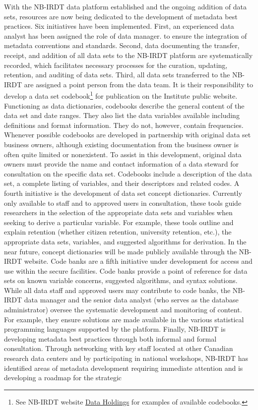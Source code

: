 With the NB-IRDT data platform established and the ongoing addition of data sets, resources are now being dedicated to the development of metadata best practices. Six initiatives have been implemented. First, an experienced data analyst has been assigned the role of data manager. to ensure the integration of metadata conventions and standards. Second, data documenting the transfer, receipt, and addition of all data sets to the NB-IRDT platform are systematically recorded, which facilitates necessary processes for the curation, updating, retention, and auditing of data sets. Third, all data sets transferred to the NB-IRDT are assigned a point person from the data team. It is their responsibility to develop a data set codebook\footnote{See NB-IRDT website \href{https://www.nbirdt.ca/holdings}{Data Holdings} for examples of available codebooks.} for publication on the Institute public website. Functioning as data dictionaries, codebooks describe the general content of the data set and date ranges. They also list the data variables available including definitions and format information. They do not, however, contain frequencies. Whenever possible codebooks are developed in partnership with original data set business owners, although existing documentation from the business owner is often quite limited or nonexistent. To assist in this development, original data owners must provide the name and contact information of a data steward for consultation on the specific data set. Codebooks include a description of the data set, a complete listing of variables, and their descriptors and related codes. A fourth initiative is the development of data set concept dictionaries. Currently only available to staff and to approved users in consultation, these tools guide researchers in the selection of the appropriate data sets and variables when seeking to derive a particular variable. For example, these tools outline and explain retention (whether citizen retention, university retention, etc.), the appropriate data sets, variables, and suggested algorithms for derivation. In the near future, concept dictionaries will be made publicly available through the NB-IRDT website. Code banks are a fifth initiative under development for access and use within the secure facilities. Code banks provide a point of reference for data sets on known variable concerns, suggested algorithms, and syntax solutions. While all data staff and approved users may contribute to code banks, the NB-IRDT data manager and the senior data analyst (who serves as the database administrator) oversee the systematic development and monitoring of content. For example, they ensure solutions are made available in the various statistical programming languages supported by the platform. Finally, NB-IRDT is developing metadata best practices through both informal and formal consultation. Through networking with key staff located at other Canadian research data centers and by participating in national workshops, NB-IRDT has identified areas of metadata development requiring immediate attention and is developing a roadmap for the strategic 